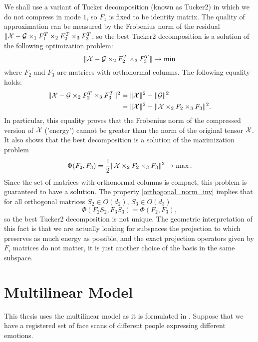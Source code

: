 We shall use a variant of Tucker decomposition (known as Tucker2)
in which we do not compress in mode $1$, so $F_1$ is fixed to be
identity matrix.  
The quality of approximation can be measured by the Frobenius norm of the residual $\| \mathcal{X} - \mathcal{G} \times _{1} F^T_1 \times _{2} F^T _2 \times _{3} F^T_3$,
so the best Tucker2 decomposition is a solution of
the following optimization problem:
\begin{equation}
    \label{tucker_min}
\| \mathcal{X} - \mathcal{G} \times_2 F_2^T \times_3 F_3^T \| \to \min
\end{equation}
where $F_2$ and $F_3$ are matrices with orthonormal columns.
The following equality holds:
\begin{equation}
\label{tucker_min}
\begin{split}
    \| \mathcal{X} - \mathcal{G} \times_2 {F_2^T} \times_3 {F_3^T} \|^2  &= \| \mathcal{X} \|^2 - \| \mathcal{G} \|^2 \\
                                                       & = \| \mathcal{X} \|^2 - \| \mathcal{X} \times_2 {F_2} \times_3 {F_3} \|^2.
\end{split}
\end{equation}
In particular, this equality proves that the Frobenius norm
of the compressed version of $\mathcal{X}$ ('energy') cannot be greater than the norm
of the original tensor $\mathcal{X}$. It also shows that the best decomposition
is a solution of the maximization problem
\begin{equation}
\label{tucker_max}
\Phi(F_2, F_3) = \frac{1}{2} \| \mathcal{X} \times_2 F_2 \times_3 F_3 \|^2 \to \max.
\end{equation}
Since the set of matrices with orthonormal columns is compact,
this problem is guaranteed to have a solution.
The property \eqref{orthogonal_norm_inv} implies that
for all orthogonal matrices $S_2 \in O(d_2)$, $S_3 \in O(d_3)$
\begin{equation}
    \Phi(F_2 S_2, F_3 S_3) = \Phi(F_2, F_3),
\end{equation}
so the best Tucker2 decomposition is not unique. 
The geometric interpretation of this fact
is that we are actually looking for subspaces
the projection to which preserves as much energy
as possible, and the exact projection operators
given by $F_i$ matrices do not matter, it is 
just another choice of the basis in the same subspace.


\section{Multilinear Model}


This thesis uses the multilinear model as it is formulated in \cite{bolkart_wuhrer_2013}.
Suppose that we have a registered set of face scans of different people expressing different
emotions.

